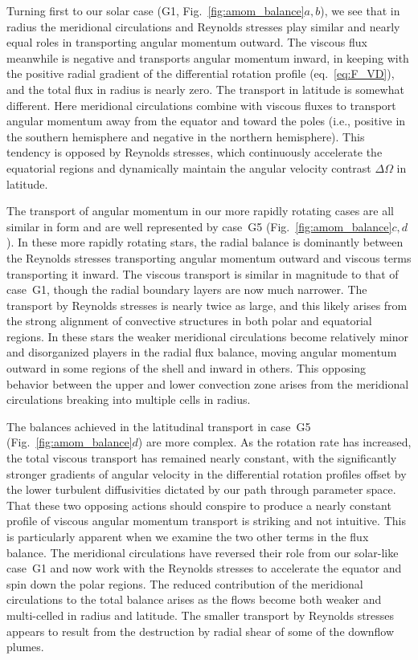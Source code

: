 Turning first to our solar case (G1, Fig.~\ref{fig:amom_balance}$a,b$),
we see that in radius the meridional circulations and Reynolds
stresses play similar and nearly equal roles in transporting angular
momentum outward.  The viscous flux meanwhile is negative and
transports angular momentum inward, in keeping with the positive
radial gradient of the differential rotation profile
(eq.~\ref{eq:F_VD}), and the total flux in radius is nearly zero.
The transport in latitude is somewhat different.  Here
meridional circulations combine with viscous fluxes to transport
angular momentum away from the equator and toward the poles
(i.e., positive in the southern hemisphere and negative in the northern
hemisphere). This tendency is opposed by Reynolds stresses, which
continuously accelerate the equatorial regions and dynamically
maintain the angular velocity contrast $\Delta \Omega$ in latitude.

The transport of angular momentum in our more rapidly rotating cases
are all similar in form and are well represented by case~G5
(Fig.~\ref{fig:amom_balance}$c,d$). 
In these more rapidly rotating stars, the radial balance is dominantly
between the Reynolds stresses transporting angular momentum outward and
viscous terms transporting it inward.  The viscous transport is
similar in magnitude to that of case~G1, though the radial boundary
layers are now much narrower.  The transport by Reynolds stresses is nearly twice
as large, and this likely arises from the strong alignment of
convective structures in both polar and equatorial regions. 
In these stars the weaker meridional circulations become relatively
minor and disorganized players in the radial flux balance, moving
angular momentum outward in some regions of the shell and inward in others.
This opposing behavior between the upper and lower convection zone
arises from the meridional circulations breaking into multiple cells
in radius. 

The balances achieved in the latitudinal transport in case~G5
(Fig.~\ref{fig:amom_balance}$d$) are more complex.  As
the rotation rate has increased, the total viscous transport has remained nearly
constant, with the significantly stronger gradients of angular velocity in
the differential rotation profiles
offset by the lower turbulent diffusivities dictated by our path
through parameter space.  That these two opposing actions should
conspire to produce a nearly constant profile of viscous angular
momentum transport is striking and not intuitive.  This is
particularly apparent when we examine the two other terms in the flux balance. 
The meridional circulations have reversed their role from our solar-like case~G1 and
now work with the Reynolds stresses to accelerate the equator and
spin down the polar regions.  The reduced contribution of the meridional
circulations to the total balance arises as the flows become both
weaker and multi-celled in radius and latitude.  
%
The smaller transport by Reynolds stresses appears to result from the
destruction by radial shear of some of the downflow plumes.

